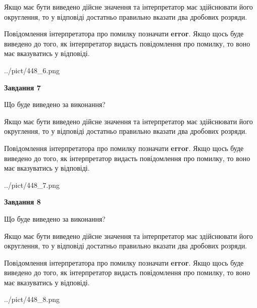 \documentclass[12pt, ukrainian]{article}
\begin{document}
{\begin {Large}
Якщо має бути виведено дійсне значення та інтерпретатор має здійснювати його округлення, 
то у відповіді достатньо правильно вказати два дробових розряди.

Повідомлення інтерпретатора про помилку позначати \textbf{error}.
Якщо щось буде виведено до того, як інтерпретатор видасть повідомлення про помилку, 
то воно має вказуватись у відповіді. \par

\begin{center}
	{../pict/448_6.png}
\end{center}
\newpage

{\begin {center}\textbf{Завдання 7}\end {center}}\par
Що буде виведено за виконання? \par

Якщо має бути виведено дійсне значення та інтерпретатор має здійснювати його округлення, 
то у відповіді достатньо правильно вказати два дробових розряди.

Повідомлення інтерпретатора про помилку позначати \textbf{error}.
Якщо щось буде виведено до того, як інтерпретатор видасть повідомлення про помилку, 
то воно має вказуватись у відповіді. \par

\begin{center}
	{../pict/448_7.png}
\end{center}
\newpage

{\begin {center}\textbf{Завдання 8}\end {center}}\par
Що буде виведено за виконання? \par

Якщо має бути виведено дійсне значення та інтерпретатор має здійснювати його округлення, 
то у відповіді достатньо правильно вказати два дробових розряди.

Повідомлення інтерпретатора про помилку позначати \textbf{error}.
Якщо щось буде виведено до того, як інтерпретатор видасть повідомлення про помилку, 
то воно має вказуватись у відповіді. \par

\begin{center}
	{../pict/448_8.png}
\end{center}
\newpage


\end{Large}}
\end{document}
